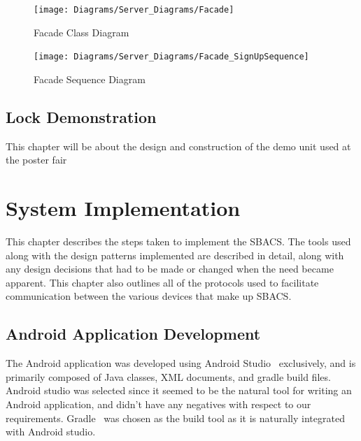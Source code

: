 \documentclass[12pt]{report}
\let\Oldsection\section
\renewcommand{\section}{\FloatBarrier\Oldsection}
\begin{document}
\begin{figure}
    \texttt{[image: Diagrams/Server\_Diagrams/Facade]}
    \caption{Facade Class Diagram}
    \label{fig:facade-server}
\end{figure}

\begin{figure}
    \texttt{[image: Diagrams/Server\_Diagrams/Facade\_SignUpSequence]}
    \caption{Facade Sequence Diagram}
    \label{fig:facade-signup}
\end{figure}




\section{Lock Demonstration} \label{lock-demonstration}

This chapter will be about the design and construction of the demo unit used at the poster fair


\chapter{System Implementation} \label{system-implementation}

This chapter describes the steps taken to implement the SBACS. The tools used along with the design patterns implemented
are described in detail, along with any design decisions that had to be made or changed when the need became apparent.
This chapter also outlines all of the protocols used to facilitate communication between the various devices that make
up SBACS.


\section{Android Application Development} \label{android-application-development}

The Android application was developed using Android Studio~\autocite{ANDROIDSTUDIO} exclusively, and is primarily composed of Java classes, XML
documents, and gradle build files. Android studio was selected since it seemed to be the natural tool for writing an
Android application, and didn't have any negatives with respect to our requirements. Gradle~\autocite{GRADLE} was chosen as the build
tool as it is naturally integrated with Android studio.
\end{document}
